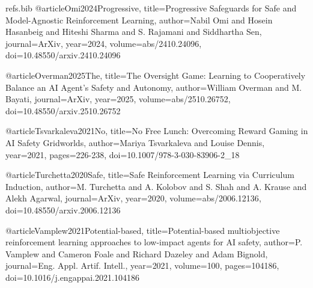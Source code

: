 \begin{filecontents}{refs.bib}
@article{Omi2024Progressive,
title={Progressive Safeguards for Safe and Model-Agnostic Reinforcement Learning},
author={Nabil Omi and Hosein Hasanbeig and Hiteshi Sharma and S. Rajamani and Siddhartha Sen},
journal={ArXiv},
year={2024},
volume={abs/2410.24096},
doi={10.48550/arxiv.2410.24096}
}

@article{Overman2025The,
title={The Oversight Game: Learning to Cooperatively Balance an AI Agent's Safety and Autonomy},
author={William Overman and M. Bayati},
journal={ArXiv},
year={2025},
volume={abs/2510.26752},
doi={10.48550/arxiv.2510.26752}
}

@article{Tsvarkaleva2021No,
title={No Free Lunch: Overcoming Reward Gaming in AI Safety Gridworlds},
author={Mariya Tsvarkaleva and Louise Dennis},
year={2021},
pages={226-238},
doi={10.1007/978-3-030-83906-2_18}
}

@article{Turchetta2020Safe,
title={Safe Reinforcement Learning via Curriculum Induction},
author={M. Turchetta and A. Kolobov and S. Shah and A. Krause and Alekh Agarwal},
journal={ArXiv},
year={2020},
volume={abs/2006.12136},
doi={10.48550/arxiv.2006.12136}
}

@article{Vamplew2021Potential-based,
title={Potential-based multiobjective reinforcement learning approaches to low-impact agents for AI safety},
author={P. Vamplew and Cameron Foale and Richard Dazeley and Adam Bignold},
journal={Eng. Appl. Artif. Intell.},
year={2021},
volume={100},
pages={104186},
doi={10.1016/j.engappai.2021.104186}
}
\end{filecontents}

\documentclass{article}
\usepackage{adjustbox}


\section*{An adaptive monitor can detect \textbf{specification gaming} using environmental dynamics and baseline invariants.}


Evaluating learned action monitors in AI Safety Gridworlds requires addressing how reward gaming surfaces observable evidence, how hidden performance functions are formalized, and which supervisory baselines enable rigorous empirical comparison  \cite{Leike2017AI} \cite{Kumar2020REALab:} \cite{cCaugatan2026Reward}.


